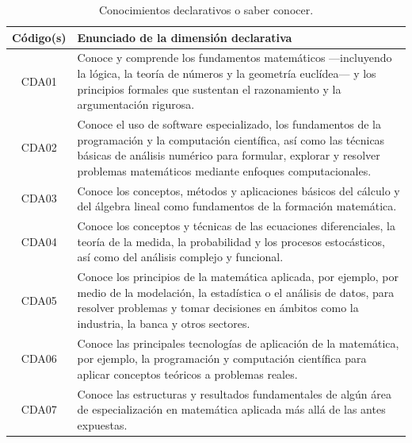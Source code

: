 \begin{table}[H]
\centering
\renewcommand{\arraystretch}{1.3}
\begin{tabular}{|c|p{9cm}|}
\hline
\cellcolor[HTML]{00C0F3}\textbf{Código(s)} & \cellcolor[HTML]{00C0F3}\textbf{Enunciado de la dimensión declarativa} \\
\hline
CDA01 & Conoce y comprende los fundamentos matemáticos —incluyendo la lógica, la teoría de números y la geometría euclídea— y los principios formales que sustentan el razonamiento y la argumentación rigurosa. \\
\hline
CDA02 & Conoce el uso de software especializado, los fundamentos de la programación y la computación científica, así como las técnicas básicas de análisis numérico para formular, explorar y resolver problemas matemáticos mediante enfoques computacionales. \\
\hline
CDA03 & Conoce los conceptos, métodos y aplicaciones básicos del cálculo y del álgebra lineal como fundamentos de la formación matemática. \\
\hline
CDA04 & Conoce los conceptos y técnicas de las ecuaciones diferenciales, la teoría de la medida, la probabilidad y los procesos estocásticos, así como del análisis complejo y funcional. \\
\hline
CDA05 & Conoce los principios de la matemática aplicada, por ejemplo, por medio de la modelación, la estadística o el análisis de datos, para resolver problemas y tomar decisiones en ámbitos como la industria, la banca y otros sectores.
\\
\hline
CDA06 & Conoce las principales tecnologías de aplicación de la matemática, por ejemplo, la programación y computación científica para aplicar conceptos teóricos a problemas reales.
\\
\hline
CDA07 & Conoce las estructuras y resultados fundamentales de algún área de especialización en matemática aplicada más allá de las antes expuestas. 
\\
\hline
\end{tabular}
\caption{Conocimientos declarativos o saber conocer.}
\label{tab:declarativa-egreso-integrada}
\end{table}


